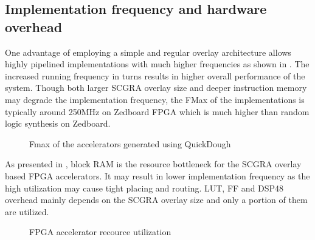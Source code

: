 \subsection{Implementation frequency and hardware overhead} \label{subsec:acc-impl}
One advantage of employing a simple and regular overlay architecture allows highly 
pipelined implementations with much higher frequencies as shown in . 
The increased running frequency in turns results in higher overall 
performance of the system. Though both larger SCGRA overlay size 
and deeper instruction memory may degrade the implementation frequency, the FMax of the
implementations is typically around 250MHz on Zedboard FPGA which is much higher than random logic
synthesis on Zedboard.

\begin{figure}[tb]
\vspace{-1em}
\caption{Fmax of the accelerators generated using QuickDough}
\label{fig:impl-freq}
\end{figure}

As presented in , block RAM is the resource bottleneck for the SCGRA overlay
based FPGA accelerators. It may result in lower implementation frequency as the high utilization may
cause tight placing and routing. LUT, FF and DSP48 overhead mainly depends on the SCGRA overlay size and only a
portion of them are utilized.

\begin{figure}[tb]
\vspace{-0.5em}
\caption{FPGA accelerator recource utilization}
\label{fig:hw-overhead}
\vspace{-1.2em}
\end{figure}


